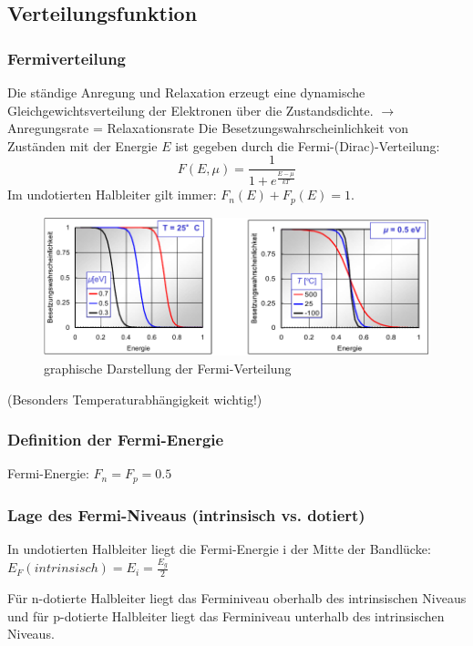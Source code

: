 \subsection{Verteilungsfunktion}
	\subsubsection{Fermiverteilung}
		Die ständige Anregung und Relaxation erzeugt eine dynamische Gleichgewichtsverteilung der Elektronen über die Zustandsdichte.
		$\rightarrow$ Anregungsrate = Relaxationsrate
		Die Besetzungswahrscheinlichkeit von Zuständen mit der Energie $E$ ist gegeben durch die Fermi-(Dirac)-Verteilung:
		\begin{equation*}
			F(E,\mu) = \frac{1}{1+ e^{\frac{E-\mu}{kT}}}
		\end{equation*}
		Im undotierten Halbleiter gilt immer: $F_n(E) + F_p(E) = 1$.
		
		\begin{figure}[h!]
			\centering
			\includegraphics[width=\textwidth]{Kapitel/Kap04/fermiVerteilung.png}
			\caption{graphische Darstellung der Fermi-Verteilung}
			\label{04_fermiVert}
		\end{figure}
		(Besonders Temperaturabhängigkeit wichtig!)
		
	\subsubsection{Definition der Fermi-Energie}
		Fermi-Energie: $F_n = F_p = 0.5$
		
	\subsubsection{Lage des Fermi-Niveaus (intrinsisch vs. dotiert)}
		In undotierten Halbleiter liegt die Fermi-Energie i der Mitte der Bandlücke:
		$E_F(intrinsisch) = E_i = \frac{E_g}{2}$	
		
		Für n-dotierte Halbleiter liegt das Ferminiveau oberhalb des intrinsischen Niveaus und für p-dotierte Halbleiter liegt das Ferminiveau unterhalb des intrinsischen Niveaus.
	
